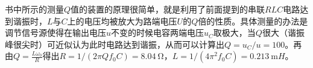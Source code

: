 \documentclass[UTF8]{ctexart}
\begin{document}
书中所示的测量$Q$值的装置的原理很简单，就是利用了前面提到的串联$RLC$电路达到谐振时，$L$与$C$上的电压均被放大为路端电压$U$的$Q$倍的性质。具体测量的办法是调节信号源使得在输出电压$u$不变的时候电容两端电压$u_C$取极大，当$Q$很大（谐振峰很尖时）可近似认为此时电路达到谐振，从而可以计算出$Q=u_C/u=100$。再由$Q=\frac{L\omega_0}{R}$得出$R=1/(2\pi Qf_0C)=\SI{8.04}{\ohm}$，$L=1/(4\pi^2f_0C)=\SI{0.213}{\milli H}$。
\begin{figure}
\centering
{}
 \\
 \\
\end{figure}
\end{document}
